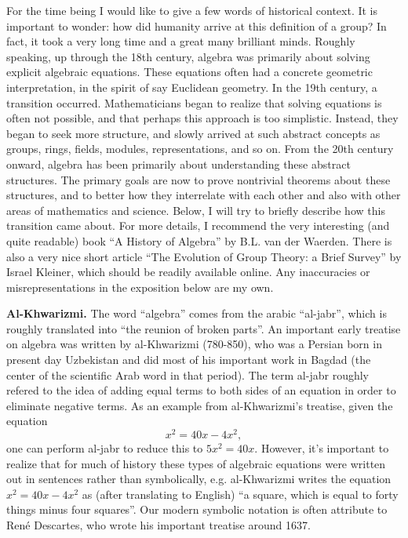\documentclass[11pt, reqno]{amsart}
\theoremstyle{remark}
\numberwithin{equation}{subsection}
\numberwithin{figure}{section}
\numberwithin{table}{section}
\newcommand{\sss}{\vspace{2.5 mm}}
\begin{document}
For the time being I would like to give a few words of historical context. It is important to wonder: how did humanity arrive at this definition of a group? In fact, it took a very long time and a great many brilliant minds. Roughly speaking, up through the 18th century, algebra was primarily about solving explicit algebraic equations. These equations often had a concrete geometric interpretation, in the spirit of say Euclidean geometry. In the 19th century, a transition occurred. Mathematicians began to realize that solving equations is often not possible, and that perhaps this approach is too simplistic. Instead, they began to seek more structure, and slowly arrived at such abstract concepts as groups, rings, fields, modules, representations, and so on.
From the 20th century onward, algebra has been primarily about understanding these abstract structures. The primary goals are now to prove nontrivial theorems about these structures, and to better how they interrelate with each other and also with other areas of mathematics and science. Below, I will try to briefly describe how this transition came about. For more details, I recommend the very interesting (and quite readable) book ``A History of Algebra'' by B.L. van der Waerden. There is also a very nice short article ``The Evolution of Group Theory: a Brief Survey'' by Israel Kleiner, which should be readily available online. Any inaccuracies or misrepresentations in the exposition below are my own.

\sss

\textbf{Al-Khwarizmi.} The word ``algebra'' comes from the arabic ``al-jabr'', which is roughly translated into ``the reunion of broken parts''. An important early treatise on algebra was written by al-Khwarizmi (780-850), who was a Persian born in present day Uzbekistan and did most of his important work in Bagdad (the center of the scientific Arab word in that period). 
The term al-jabr roughly refered to the idea of adding equal terms to both sides of an equation in order to eliminate negative terms. As an example from al-Khwarizmi's treatise, given the equation $$x^2 = 40x - 4x^2,$$ one can perform al-jabr to reduce this to $5x^2 = 40x$. 
However, it's important to realize that for much of history these types of algebraic equations were written out in sentences rather than symbolically, e.g. al-Khwarizmi writes the equation $x^2 = 40x- 4x^2$ as (after translating to English) ``a square, which is equal to forty things minus four squares''. Our modern symbolic notation is often attribute to Ren\'e Descartes, who wrote his important treatise around 1637.
\end{document}

